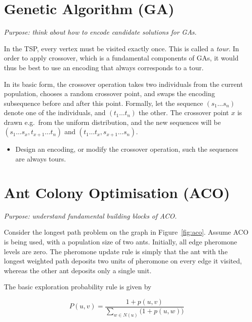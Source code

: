 \documentclass[a4paper]{article}
\begin{document}
%
%



\section*{Genetic Algorithm (GA)}

\emph{Purpose: think about how to encode candidate solutions for GAs.}

\noindent
In the TSP, every vertex must be visited exactly once.
This is called a \emph{tour}.
In order to apply crossover, which is a fundamental components of GAs, it would thus be best to use an encoding that always corresponds to a tour.

In its basic form, the crossover operation takes two individuals from the current population, chooses a random crossover point, and swaps the encoding subsequence before and after this point.
Formally, let the sequence $(s_1 \ldots s_n)$ denote one of the individuals, and $(t_1 \ldots t_n)$ the other.
The crossover point $x$ is drawn e.g.\ from the uniform distribution, and the new sequences will be $(s_1 \ldots s_x, t_{x+1} \ldots t_n)$ and $(t_1 \ldots t_x, s_{x+1} \ldots s_n)$.

\begin{itemize}
\item
  Design an encoding, or modify the crossover operation, such the sequences are always tours.
\end{itemize}



\section*{Ant Colony Optimisation (ACO)}

\emph{Purpose: understand fundamental building blocks of ACO.}

\noindent
Consider the longest path problem on the graph in Figure~\ref{fig:aco}.
Assume ACO is being used, with a population size of two ants.
Initially, all edge pheromone levels are zero.
The pheromone update rule is simply that the ant with the longest weighted path deposits two units of pheromone on every edge it visited, whereas the other ant deposits only a single unit.

The basic exploration probability rule is given by

\begin{equation}
  P(u,v) = \frac{1 + p(u,v)}{\sum_{w \in N(u)} \bigl(1 + p(u,w)\bigr)}
\end{equation}
\end{document}
